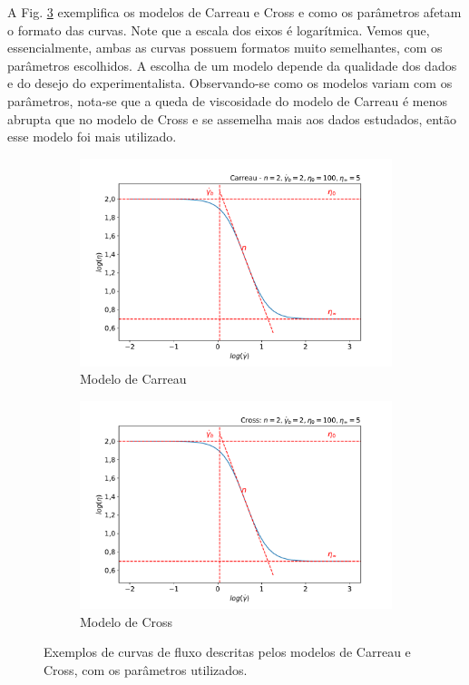		A Fig. \ref{fig:reologia_modelos} exemplifica os modelos de Carreau e Cross e como os parâmetros afetam o formato das curvas. Note que a escala dos eixos é logarítmica. Vemos que, essencialmente, ambas as curvas possuem formatos muito semelhantes, com os parâmetros escolhidos. A escolha de um modelo depende da qualidade dos dados e do desejo do experimentalista. Observando-se como os modelos variam com os parâmetros, nota-se que a queda de viscosidade do modelo de Carreau é menos abrupta que no modelo de Cross e se assemelha mais aos dados estudados, então esse modelo foi mais utilizado.
		
		\begin{figure}[H]
			\begin{subfigure}[t]{0.45\textwidth}
				\centering
				\includegraphics[width=\textwidth]{./imagens/reologia/Carreau}
				\caption{Modelo de Carreau}
				\label{fig:reologia_modelo_carreau}
			\end{subfigure} \qquad %
			\begin{subfigure}[t]{0.45\textwidth}
				\centering
				\includegraphics[width=\textwidth]{./imagens/reologia/Cross}
				\caption{Modelo de Cross}
				\label{fig:reologia_modelo_cross}
			\end{subfigure}
			\caption{Exemplos de curvas de fluxo descritas pelos modelos de Carreau e Cross, com os parâmetros utilizados.}
			\label{fig:reologia_modelos}
		\end{figure}
		
